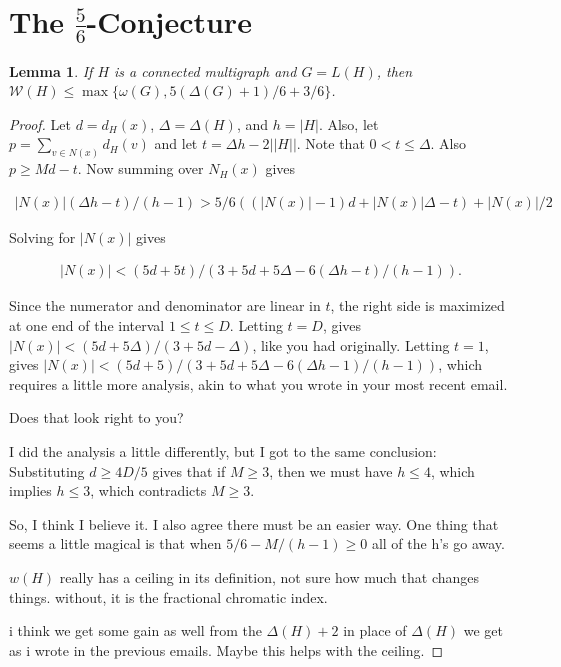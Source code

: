 \documentclass[12pt]{amsart}
\theoremstyle{plain}
\newtheorem{lem}[thm]{Lemma}
\theoremstyle{definition}
\theoremstyle{remark}
\newcommand{\fancy}[1]{\mathcal{#1}}
\newcommand{\W}{\fancy{W}}
\begin{document}
\newpage

\section{The $\frac56$-Conjecture}
\begin{lem}
If $H$ is a connected multigraph and $G = L(H)$, then $\W(H) \le
\max\{\omega(G), 5(\Delta(G) + 1) / 6 + 3/6\}$.
\end{lem}
\begin{proof}
Let $d = d_H(x)$,  $\Delta = \Delta(H)$, and $h = |H|$. 
Also, let $p = \sum_{v \in N(x)} d_H(v)$ and
let $t = \Delta h-2||H||$.
Note that $0 < t \le \Delta$.  Also $p \ge Md - t$.  Now summing over $N_H(x)$
gives

\begin{align*}
|N(x)|(\Delta h-t)/(h-1) > 5/6((|N(x)|-1)d + |N(x)|\Delta - t) + |N(x)|/2
\end{align*}

Solving for $|N(x)|$ gives

\begin{align*}
|N(x)| < (5d+5t)/(3+5d+5\Delta-6(\Delta h-t)/(h-1)).
\end{align*}

Since the numerator and denominator are linear in $t$, the right side is
maximized at one end of the interval $1 \le t \le D$.  Letting $t = D$,
gives $|N(x)| < (5d+5\Delta)/(3+5d-\Delta)$, like you had originally.  Letting $t = 1$,
gives $|N(x)| < (5d+5)/(3+5d+5\Delta-6(\Delta h-1)/(h-1))$, which requires a little more
analysis, akin to what you wrote in your most recent email.

Does that look right to you?



I did the analysis a little differently, but I got to the same
conclusion: Substituting $d \ge 4D/5$ gives that if $M \ge 3$, then we
must have $h \le 4$, which implies $h \le 3$, which contradicts $M \ge 3$.

So, I think I believe it.  I also agree there must be an easier way.
One thing that seems a little magical is that when $5/6 - M/(h-1) \ge 0$
all of the h's go away.

$w(H)$ really has a ceiling in its definition, not sure how much that changes
things.   without, it is the fractional chromatic index.

i think we get some gain as well from the $\Delta(H) + 2$ in place of $\Delta(H)$
we get as i wrote in the previous emails.   Maybe this helps with the ceiling.


\end{proof}
\end{document}
